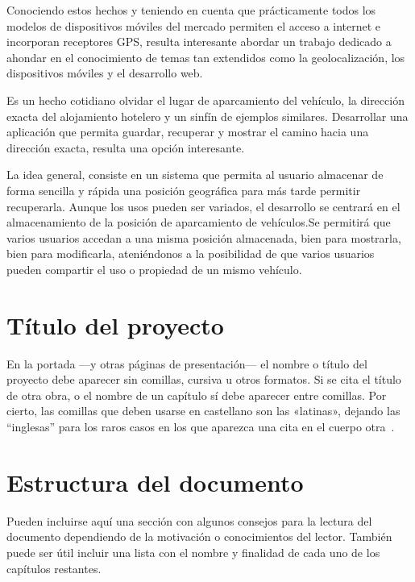 
Conociendo estos hechos y teniendo en cuenta que prácticamente todos los modelos de dispositivos móviles del mercado permiten el acceso a internet e incorporan receptores \ac{GPS}, resulta interesante abordar un trabajo dedicado a ahondar en el conocimiento de temas tan extendidos como la geolocalización, los dispositivos móviles y el desarrollo web.

Es un hecho cotidiano olvidar el lugar de aparcamiento del vehículo, la dirección exacta del alojamiento hotelero y un sinfín de ejemplos similares. Desarrollar una aplicación que permita guardar, recuperar y mostrar el camino hacia una dirección exacta, resulta una opción interesante.

La idea general, consiste en un sistema que permita al usuario almacenar de forma sencilla y rápida una posición geográfica para más tarde permitir recuperarla. Aunque los usos pueden ser variados, el desarrollo se centrará en el almacenamiento de la posición de aparcamiento de vehículos.Se permitirá que varios usuarios accedan a una misma posición almacenada, bien para mostrarla, bien para modificarla, ateniéndonos a la posibilidad de que varios usuarios pueden compartir el uso o propiedad de un mismo vehículo.




\section{Título del proyecto}

En la portada ---y otras páginas de presentación--- el nombre o título del
proyecto debe aparecer sin comillas, cursiva u otros formatos. Si se cita el
título de otra obra, o el nombre de un capítulo sí debe aparecer entre
comillas. Por cierto, las comillas que deben usarse en castellano son las
«latinas», dejando las ``inglesas'' para los raros casos en los que aparezca una
cita en el cuerpo otra~\cite{sousa}.


\section{Estructura del documento}

Pueden incluirse aquí una sección con algunos consejos para la lectura del
documento dependiendo de la motivación o conocimientos del lector.  También
puede ser útil incluir una lista con el nombre y finalidad de cada uno de los
capítulos restantes.

